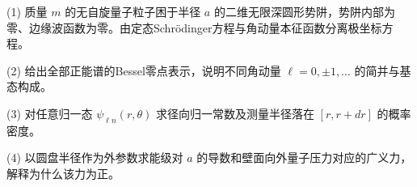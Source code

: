 (1) 质量 \(m\) 的无自旋量子粒子困于半径 \(a\) 的二维无限深圆形势阱，势阱内部为零、边缘波函数为零。由定态Schrödinger方程与角动量本征函数分离极坐标方程。

(2) 给出全部正能谱的Bessel零点表示，说明不同角动量 \(\ell=0,\pm1,\dots\) 的简并与基态构成。

(3) 对任意归一态 \(\psi_{\ell n}(r,\theta)\) 求径向归一常数及测量半径落在 \([r,r+dr]\) 的概率密度。

(4) 以圆盘半径作为外参数求能级对 \(a\) 的导数和壁面向外量子压力对应的广义力，解释为什么该力为正。

